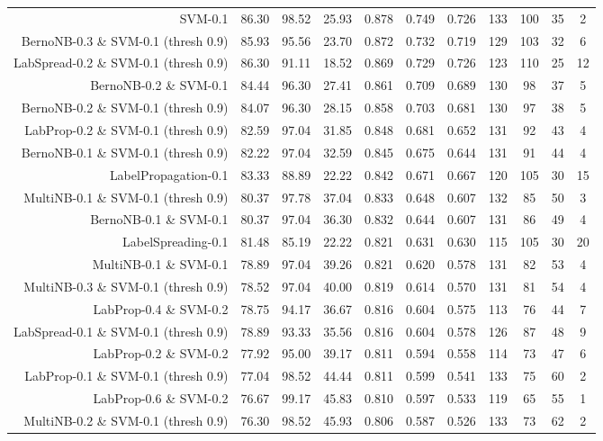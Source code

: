 \begin{table}[!htb]
\begin{tabular}{r|c|c|c|c|c|c|c|c|c|c}
SVM-0.1 & 86.30 & 98.52 & 25.93 & 0.878 & 0.749 & 0.726 & 133 & 100 & 35 & 2 \\ 
BernoNB-0.3 \& SVM-0.1 (thresh 0.9) & 85.93 & 95.56 & 23.70 & 0.872 & 0.732 & 0.719 & 129 & 103 & 32 & 6 \\ 
LabSpread-0.2 \& SVM-0.1 (thresh 0.9) & 86.30 & 91.11 & 18.52 & 0.869 & 0.729 & 0.726 & 123 & 110 & 25 & 12 \\ 
BernoNB-0.2 \& SVM-0.1 & 84.44 & 96.30 & 27.41 & 0.861 & 0.709 & 0.689 & 130 & 98 & 37 & 5 \\ 
BernoNB-0.2 \& SVM-0.1 (thresh 0.9) & 84.07 & 96.30 & 28.15 & 0.858 & 0.703 & 0.681 & 130 & 97 & 38 & 5 \\ 
LabProp-0.2 \& SVM-0.1 (thresh 0.9) & 82.59 & 97.04 & 31.85 & 0.848 & 0.681 & 0.652 & 131 & 92 & 43 & 4 \\ 
BernoNB-0.1 \& SVM-0.1 (thresh 0.9) & 82.22 & 97.04 & 32.59 & 0.845 & 0.675 & 0.644 & 131 & 91 & 44 & 4 \\ 
LabelPropagation-0.1 & 83.33 & 88.89 & 22.22 & 0.842 & 0.671 & 0.667 & 120 & 105 & 30 & 15 \\ 
MultiNB-0.1 \& SVM-0.1 (thresh 0.9) & 80.37 & 97.78 & 37.04 & 0.833 & 0.648 & 0.607 & 132 & 85 & 50 & 3 \\ 
BernoNB-0.1 \& SVM-0.1 & 80.37 & 97.04 & 36.30 & 0.832 & 0.644 & 0.607 & 131 & 86 & 49 & 4 \\ 
LabelSpreading-0.1 & 81.48 & 85.19 & 22.22 & 0.821 & 0.631 & 0.630 & 115 & 105 & 30 & 20 \\ 
MultiNB-0.1 \& SVM-0.1 & 78.89 & 97.04 & 39.26 & 0.821 & 0.620 & 0.578 & 131 & 82 & 53 & 4 \\ 
MultiNB-0.3 \& SVM-0.1 (thresh 0.9) & 78.52 & 97.04 & 40.00 & 0.819 & 0.614 & 0.570 & 131 & 81 & 54 & 4 \\ 
LabProp-0.4 \& SVM-0.2 & 78.75 & 94.17 & 36.67 & 0.816 & 0.604 & 0.575 & 113 & 76 & 44 & 7 \\ 
LabSpread-0.1 \& SVM-0.1 (thresh 0.9) & 78.89 & 93.33 & 35.56 & 0.816 & 0.604 & 0.578 & 126 & 87 & 48 & 9 \\ 
LabProp-0.2 \& SVM-0.2 & 77.92 & 95.00 & 39.17 & 0.811 & 0.594 & 0.558 & 114 & 73 & 47 & 6 \\ 
LabProp-0.1 \& SVM-0.1 (thresh 0.9) & 77.04 & 98.52 & 44.44 & 0.811 & 0.599 & 0.541 & 133 & 75 & 60 & 2 \\ 
LabProp-0.6 \& SVM-0.2 & 76.67 & 99.17 & 45.83 & 0.810 & 0.597 & 0.533 & 119 & 65 & 55 & 1 \\ 
MultiNB-0.2 \& SVM-0.1 (thresh 0.9) & 76.30 & 98.52 & 45.93 & 0.806 & 0.587 & 0.526 & 133 & 73 & 62 & 2 \\ 

\end{tabular}
\end{table}
